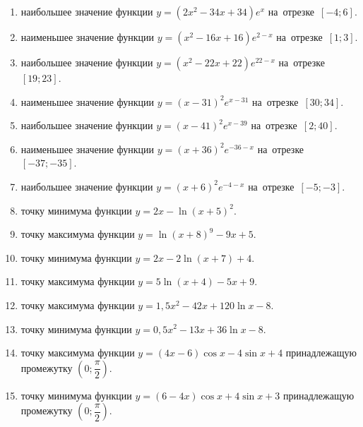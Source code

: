 \documentclass[a4paper,10pt]{article}
\begin{document}
\begin{enumerate}
\item {} наибольшее значение функции $y=\left(2x^2 -34x +34\right)e^{x}$ на~отрезке~$\left[-4;6\right]$.

\item {} наименьшее значение функции $y=\left(x^2 -16x +16\right)e^{2-x}$ на~отрезке~$\left[1;3\right]$.

\item {} наибольшее значение функции $y=\left(x^2 -22x +22\right)e^{22-x}$ на~отрезке~$\left[19;23\right]$.

\item {} наименьшее значение функции $y=\left(x-31\right)^2e^{x-31}$ на~отрезке~$\left[30;34\right]$.

\item {} наибольшее значение функции $y=\left(x-41\right)^2e^{x-39}$ на~отрезке~$\left[2;40\right]$.

\item {} наименьшее значение функции $y=\left(x+36\right)^2e^{-36-x}$ на~отрезке~$\left[-37;-35\right]$.

\item {} наибольшее значение функции $y=\left(x+6\right)^2e^{-4-x}$ на~отрезке~$\left[-5;-3\right]$.

\item {} точку минимума функции $y=2x-\ln\left(x+5\right)^{2}$.

\item {} точку максимума функции $y=\ln\left(x+8\right)^{9}-9x+5$.

\item {} точку минимума функции $y=2x-2\ln\left(x+7\right)+4$.

\item {} точку максимума функции $y=5\ln\left(x+4\right)-5x+9$.

\item {} точку максимума функции $y=1,5x^2-42x+120\ln x -8$.

\item {} точку минимума функции $y=0,5x^2-13x+36\ln x -8$.

\item {} точку максимума функции $y=\left(4x-6\right)\cos x -4\sin x+4$
принадлежащую промежутку $\left(0;\dfrac{\pi}{2}\right)$.

\item {} точку минимума функции $y=\left(6-4x\right)\cos x +4\sin x+3$
принадлежащую промежутку $\left(0;\dfrac{\pi}{2}\right)$.


\end{enumerate}
\end{document}

